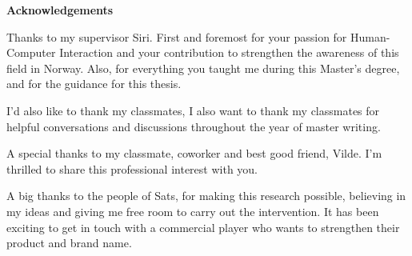 \vspace*{\fill}

\vspace{1cm}
\begin{flushleft}

\large
\textbf{Acknowledgements}

Thanks to my supervisor Siri. First and foremost for your passion for Human-Computer Interaction and your contribution to strengthen the awareness of this field in Norway. Also, for everything you taught me during this Master's degree, and for the guidance for this thesis.  


I'd also like to thank my classmates, I also want to thank my classmates for helpful conversations and discussions throughout the year of master writing. 

A special thanks to my classmate, coworker and best good friend, Vilde. I'm thrilled to share this professional interest with you.  





A big thanks to the people of Sats, for making this research possible, believing in my ideas and giving me free room to carry out the intervention. It has been exciting to get in touch with a commercial player who wants to strengthen their product and brand name. 

\vspace{1cm}


\end{flushleft}

